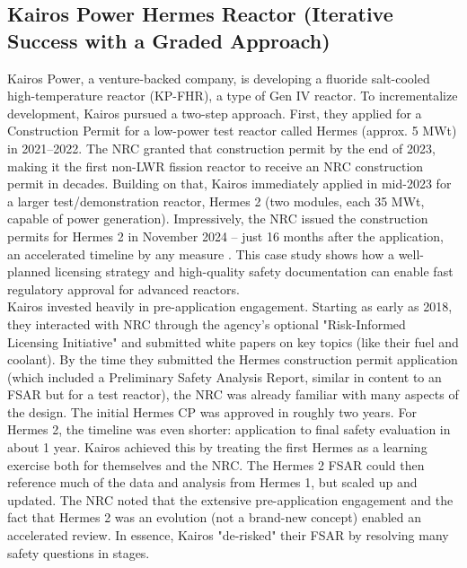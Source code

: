 \documentclass[5p,authoryear]{elsarticle}
\begin{document}
\subsection{Kairos Power Hermes Reactor (Iterative Success with a Graded Approach)}
\vspace{0.2cm}

Kairos Power, a venture-backed company, is developing a fluoride salt-cooled high-temperature reactor (KP-FHR), a type of Gen IV reactor. To incrementalize development, Kairos pursued a two-step approach. First, they applied for a Construction Permit for a low-power test reactor called Hermes (approx. 5 MWt) in 2021–2022. The NRC granted that construction permit by the end of 2023, making it the first non-LWR fission reactor to receive an NRC construction permit in decades. Building on that, Kairos immediately applied in mid-2023 for a larger test/demonstration reactor, Hermes 2 (two modules, each 35 MWt, capable of power generation). Impressively, the NRC issued the construction permits for Hermes 2 in November 2024 – just 16 months after the application, an accelerated timeline by any measure \cite{GAIN2024}. This case study shows how a well-planned licensing strategy and high-quality safety documentation can enable fast regulatory approval for advanced reactors. \\

Kairos invested heavily in pre-application engagement. Starting as early as 2018, they interacted with NRC through the agency’s optional "Risk-Informed Licensing Initiative" and submitted white papers on key topics (like their fuel and coolant). By the time they submitted the Hermes construction permit application (which included a Preliminary Safety Analysis Report, similar in content to an FSAR but for a test reactor), the NRC was already familiar with many aspects of the design. The initial Hermes CP was approved in roughly two years. For Hermes 2, the timeline was even shorter: application to final safety evaluation in about 1 year. Kairos achieved this by treating the first Hermes as a learning exercise both for themselves and the NRC. The Hermes 2 FSAR could then reference much of the data and analysis from Hermes 1, but scaled up and updated. The NRC noted that the extensive pre-application engagement and the fact that Hermes 2 was an evolution (not a brand-new concept) enabled an accelerated review. In essence, Kairos "de-risked" their FSAR by resolving many safety questions in stages. \\
\end{document}
